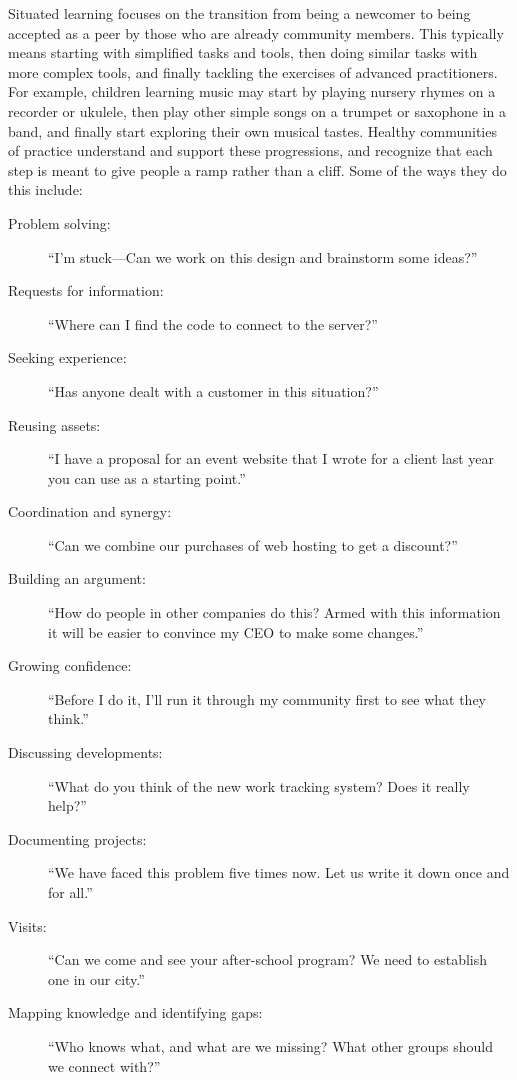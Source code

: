 Situated learning focuses on the transition from being a newcomer to
being accepted as a peer by those who are already community members.
This typically means starting with simplified tasks and tools, then
doing similar tasks with more complex tools, and finally tackling the
exercises of advanced practitioners. For example, children learning
music may start by playing nursery rhymes on a recorder or ukulele, then
play other simple songs on a trumpet or saxophone in a band, and finally
start exploring their own musical tastes. Healthy communities of
practice understand and support these progressions, and recognize that
each step is meant to give people a ramp rather than a cliff. Some of
the ways they do this include:

\begin{description}
\item[Problem solving:]
``I'm stuck---Can we work on this design and brainstorm some ideas?''
\item[Requests for information:]
``Where can I find the code to connect to the server?''
\item[Seeking experience:]
``Has anyone dealt with a customer in this situation?''
\item[Reusing assets:]
``I have a proposal for an event website that I wrote for a client
last year you can use as a starting point.''
\item[Coordination and synergy:]
``Can we combine our purchases of web hosting to get a discount?''
\item[Building an argument:]
``How do people in other companies do this? Armed with this
information it will be easier to convince my CEO to make some
changes.''
\item[Growing confidence:]
``Before I do it, I'll run it through my community first to see what
they think.''
\item[Discussing developments:]
``What do you think of the new work tracking system? Does it really
help?''
\item[Documenting projects:]
``We have faced this problem five times now. Let us write it down
once and for all.''
\item[Visits:]
``Can we come and see your after-school program? We need to establish
one in our city.''
\item[Mapping knowledge and identifying gaps:]
``Who knows what, and what are we missing? What other groups should
we connect with?''
\end{description}

